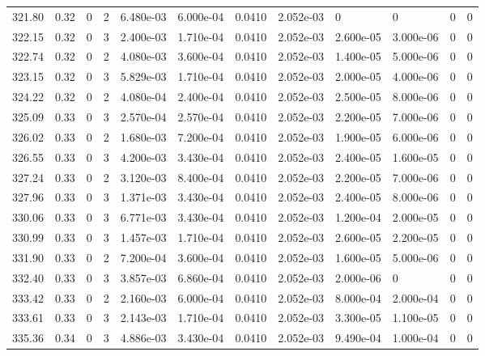 \documentclass[preview]{standalone}
\begin{document}
{{{{{{{{{{{{\begin{tabular}{L{1.2cm}C{1.2cm} C{0.3cm}C{0.5cm} C{1.4cm}C{1.4cm} C{1.4cm}C{1.4cm} C{1.6cm}C{1.6cm} C{1.6cm}C{1.6cm}}
  321.80  &  0.32  & 0     &  2 &  6.480e-03  & 6.000e-04  &  0.0410&   2.052e-03& 0 & 0   &  0 & 0  \\ 
  322.15  &  0.32  & 0     &  3 &  2.400e-03  & 1.710e-04  &  0.0410&   2.052e-03& 2.600e-05 & 3.000e-06   &  0 & 0  \\ 
  322.74  &  0.32  & 0     &  2 &  4.080e-03  & 3.600e-04  &  0.0410&   2.052e-03& 1.400e-05 & 5.000e-06   &  0 & 0  \\ 
  323.15  &  0.32  & 0     &  3 &  5.829e-03  & 1.710e-04  &  0.0410&   2.052e-03& 2.000e-05 & 4.000e-06   &  0 & 0  \\ 
  324.22  &  0.32  & 0     &  2 &  4.080e-04  & 2.400e-04  &  0.0410&   2.052e-03& 2.500e-05 & 8.000e-06   &  0 & 0  \\ 
  325.09  &  0.33  & 0     &  3 &  2.570e-04  & 2.570e-04  &  0.0410&   2.052e-03& 2.200e-05 & 7.000e-06   &  0 & 0  \\ 
  326.02  &  0.33  & 0     &  2 &  1.680e-03  & 7.200e-04  &  0.0410&   2.052e-03& 1.900e-05 & 6.000e-06   &  0 & 0  \\ 
  326.55  &  0.33  & 0     &  3 &  4.200e-03  & 3.430e-04  &  0.0410&   2.052e-03& 2.400e-05 & 1.600e-05   &  0 & 0  \\ 
  327.24  &  0.33  & 0     &  2 &  3.120e-03  & 8.400e-04  &  0.0410&   2.052e-03& 2.200e-05 & 7.000e-06   &  0 & 0  \\ 
  327.96  &  0.33  & 0     &  3 &  1.371e-03  & 3.430e-04  &  0.0410&   2.052e-03& 2.400e-05 & 8.000e-06   &  0 & 0  \\ 
  330.06  &  0.33  & 0     &  3 &  6.771e-03  & 3.430e-04  &  0.0410&   2.052e-03& 1.200e-04 & 2.000e-05   &  0 & 0  \\ 
  330.99  &  0.33  & 0     &  3 &  1.457e-03  & 1.710e-04  &  0.0410&   2.052e-03& 2.600e-05 & 2.200e-05   &  0 & 0  \\ 
  331.90  &  0.33  & 0     &  2 &  7.200e-04  & 3.600e-04  &  0.0410&   2.052e-03& 1.600e-05 & 5.000e-06   &  0 & 0  \\ 
  332.40  &  0.33  & 0     &  3 &  3.857e-03  & 6.860e-04  &  0.0410&   2.052e-03& 2.000e-06 & 0   &  0 & 0  \\ 
  333.42  &  0.33  & 0     &  2 &  2.160e-03  & 6.000e-04  &  0.0410&   2.052e-03& 8.000e-04 & 2.000e-04   &  0 & 0  \\ 
  333.61  &  0.33  & 0     &  3 &  2.143e-03  & 1.710e-04  &  0.0410&   2.052e-03& 3.300e-05 & 1.100e-05   &  0 & 0  \\ 
  335.36  &  0.34  & 0     &  3 &  4.886e-03  & 3.430e-04  &  0.0410&   2.052e-03& 9.490e-04 & 1.000e-04   &  0 & 0  \\ 

\end{tabular}}}}}}}}}}}}}
\end{document}
